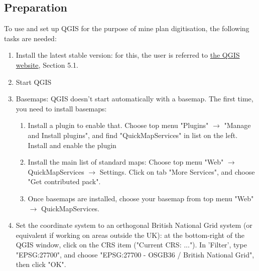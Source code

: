 \subsection{Preparation}
To use and set up QGIS for the purpose of mine plan digitisation, the following tasks are needed:
\begin{enumerate}
    \item Install the latest stable version: for this, the user is referred to \href{https://docs.qgis.org/3.34/en/docs/user_manual}{the QGIS website}, Section 5.1.
    \item Start QGIS
    \item Basemaps: QGIS doesn’t start automatically with a basemap. The first time, you need to install basemaps: 
    \begin{enumerate}
        \item Install a plugin to enable that. Choose top menu "Plugins" $\rightarrow$ "Manage and Install plugins", and find "QuickMapServices" in list on the left. Install and enable the plugin
        \item Install the main list of standard maps: 
        Choose top menu "Web" $\rightarrow$ QuickMapServices $\rightarrow$ Settings. Click on tab "More Services", and choose "Get contributed pack".
        \item Once basemaps are installed, choose your basemap from top menu "Web" $\rightarrow$ QuickMapServices.
    \end{enumerate}
    \item Set the coordinate system to an orthogonal British National Grid system (or equivalent if working on areas outside the UK): at the bottom-right of the QGIS window, click on the CRS item ("Current CRS: ..."). In 'Filter', type "EPSG:27700", and choose "EPSG:27700 - OSGB36 / British National Grid", then click "OK". 
\end{enumerate}
